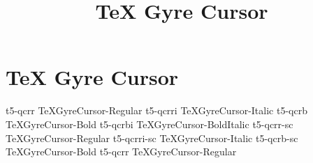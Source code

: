 \documentclass[sample]{vnsample}
\title{TeX Gyre Cursor}
\begin{document}
\section{TeX Gyre Cursor}
    {t5-qcrr}     {TeXGyreCursor-Regular}
   {t5-qcrri}    {TeXGyreCursor-Italic}
    {t5-qcrb}     {TeXGyreCursor-Bold}
   {t5-qcrbi}    {TeXGyreCursor-BoldItalic}
   {t5-qcrr-sc}  {TeXGyreCursor-Regular}
 {t5-qcrri-sc} {TeXGyreCursor-Italic}
   {t5-qcrb-sc}  {TeXGyreCursor-Bold}
    {t5-qcrr}     {TeXGyreCursor-Regular}
\end{document}
